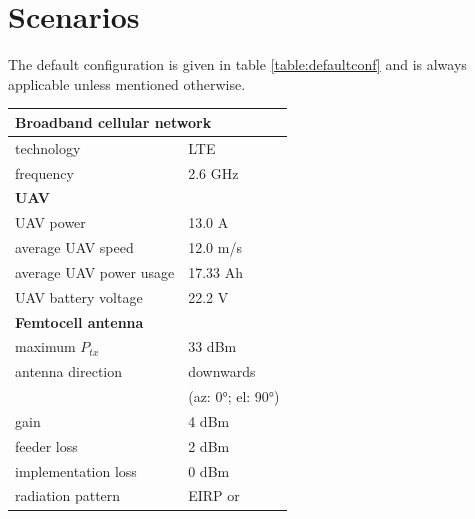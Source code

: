 \documentclass[twocolumn]{phdsymp} %
\begin{document}
\section{Scenarios}
The default configuration is given in table \ref{table:defaultconf} and is always applicable unless mentioned otherwise. 

\begin{table}[!htb]
\centering
\begin{tabular}[t]{ll}
        \toprule
        \multicolumn{2}{l}{\textbf{Broadband cellular network}} \\
        \hline
        \hspace{3mm}  technology        & LTE     \\
        \hspace{3mm}  frequency         & 2.6 GHz \\
        \hline
        \multicolumn{2}{l}{\textbf{UAV}} \\
        \hline  
        \hspace{3mm}  UAV power                 & 13.0 A   \\
        \hspace{3mm}  average UAV speed         & 12.0 m/s \\
        \hspace{3mm}  average UAV power usage   & 17.33 Ah    \\
        \hspace{3mm}  UAV battery voltage       & 22.2 V \\
        \hline
        \multicolumn{2}{l}{\textbf{Femtocell antenna}} \\
        \hline  
        \hspace{3mm}  maximum $P_{tx}$          & 33 dBm   \\
        \hspace{3mm}  antenna  direction        & downwards   \\ 
        \hspace{3mm}                            & (az: \ang{0}; el: \ang{90})    \\
        \hspace{3mm}  gain                      & 4 dBm   \\ 
        \hspace{3mm}  feeder loss               & 2 dBm   \\ 
        \hspace{3mm}  implementation loss       & 0 dBm   \\
        \hspace{3mm}  radiation pattern         & EIRP or\\

\end{tabular}
\end{table}
\end{document}
